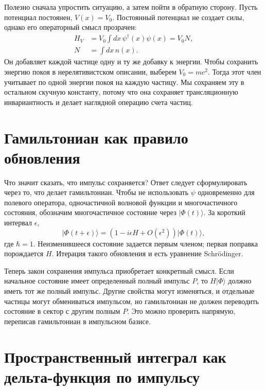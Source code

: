 Полезно сначала упростить ситуацию, а затем пойти в обратную сторону. Пусть потенциал постоянен, \(V(x)=V_0\). Постоянный потенциал не создает силы, однако его операторный смысл прозрачен:
\begin{equation}
\begin{aligned}
H_V&=V_0\int dx\,\psi^\dagger(x)\psi(x)=V_0N,\\
N&=\int dx\,n(x).
\end{aligned}
\end{equation}
Он добавляет каждой частице одну и ту же добавку к энергии. Чтобы сохранить энергию покоя в нерелятивистском описании, выберем \(V_0=mc^2\). Тогда этот член учитывает по одной энергии покоя на каждую частицу. Мы сохраняем эту в остальном скучную константу, потому что она сохраняет трансляционную инвариантность и делает наглядной операцию счета частиц.

\section{Гамильтониан как правило обновления}

Что значит сказать, что импульс сохраняется? Ответ следует сформулировать через то, что делает гамильтониан. Чтобы не использовать \(\psi\) одновременно для полевого оператора, одночастичной волновой функции и многочастичного состояния, обозначим многочастичное состояние через \(\lvert\Phi(t)\rangle\). За короткий интервал \(\epsilon\),
\begin{equation}
\lvert\Phi(t+\epsilon)\rangle
=\left(1-i\epsilon H+O(\epsilon^2)\right)
\lvert\Phi(t)\rangle,
\label{eq:l9-short-update}
\end{equation}
где \(\hbar=1\). Неизменившееся состояние задается первым членом; первая поправка порождается \(H\). Итерация такого обновления и есть уравнение Schr\"odinger.

Теперь закон сохранения импульса приобретает конкретный смысл. Если начальное состояние имеет определенный полный импульс \(P\), то \(H\lvert\Phi\rangle\) должно иметь тот же полный импульс. Другие свойства могут изменяться, и отдельные частицы могут обмениваться импульсом, но гамильтониан не должен переводить состояние в сектор с другим полным \(P\). Это можно проверить напрямую, переписав гамильтониан в импульсном базисе.

\section{Пространственный интеграл как дельта-функция по импульсу}

